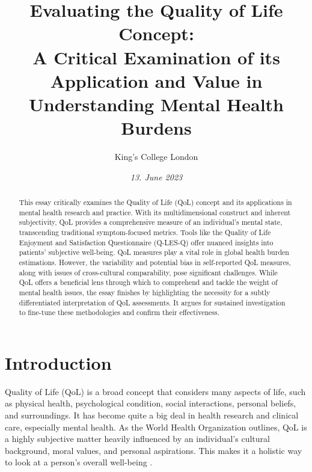 \documentclass[10pt]{article}
\title{\textbf{Evaluating the Quality of Life Concept:} \\ A Critical Examination of its Application and Value in Understanding Mental Health Burdens}
\author[ ]{King’s College London}
\date{\textit{13. June 2023}}
\begin{document}

\maketitle
\thispagestyle{empty}

\begin{sloppypar} %
  \begin{abstract}
    This essay critically examines the Quality of Life (QoL) concept and its applications in mental health research and practice. With its multidimensional construct and inherent subjectivity, QoL provides a comprehensive measure of an individual’s mental state, transcending traditional symptom-focused metrics. Tools like the Quality of Life Enjoyment and Satisfaction Questionnaire (Q-LES-Q) offer nuanced insights into patients’ subjective well-being. QoL measures play a vital role in global health burden estimations. However, the variability and potential bias in self-reported QoL measures, along with issues of cross-cultural comparability, pose significant challenges. While QoL offers a beneficial lens through which to comprehend and tackle the weight of mental health issues, the essay finishes by highlighting the necessity for a subtly differentiated interpretation of QoL assessments. It argues for sustained investigation to fine-tune these methodologies and confirm their effectiveness.
  \end{abstract}
  \pagebreak

  \tableofcontents
  \pagebreak

  \listoffigures
  \pagebreak

  \listoftables
  \pagebreak


  \doublespacing

  \section{Introduction} \label{sec:introduction}
  Quality of Life (QoL) is a broad concept that considers many aspects of life, such as physical health, psychological condition, social interactions, personal beliefs, and surroundings. It has become quite a big deal in health research and clinical care, especially mental health. As the World Health Organization outlines, QoL is a highly subjective matter heavily influenced by an individual’s cultural background, moral values, and personal aspirations. This makes it a holistic way to look at a person’s overall well-being \citep{harper_development_1998}.


\end{sloppypar}
\end{document}
